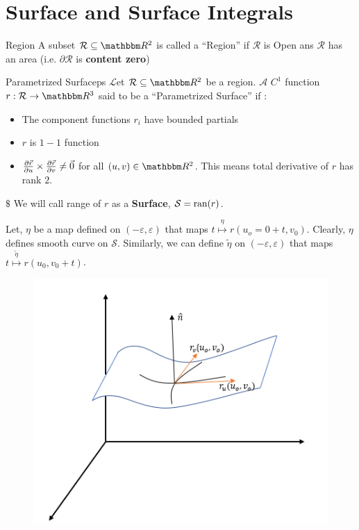 \documentclass[../Analysis-3]{subfiles}
\begin{document}
\section{Surface and Surface Integrals}

\begin{Def}{Region}{}
    A subset $\mathcal{R} \subseteq \R^2$ is called a \enquote{Region} if $\mathcal{R}$ is Open ans $\mathcal{R}$ has an area (i.e. $\partial \mathcal{R}$ is \textbf{content zero})
\end{Def}

\begin{Def}{Parametrized Surface}{ps}
    $\mathcal{L}$et $\mathcal{R} \subseteq \R^2$ be a region. $\mathcal{A}$ $C^1$ function $r:\mathcal{R} \to \R^3$ said to be a \enquote{Parametrized Surface} if :
    \begin{itemize}
        \item The component functions $r_i$ have bounded partials
        \item $r$ is $1-1$ function
        \item $\pdv{\vec{r}}{u} \times \pdv{\vec{r}}{v} \neq \vec{0}$ for all $(u,v) \in \R^2$. This means total derivative of $r$ has rank $2$.
    \end{itemize}
    $\$$ We will call range of $r$ as a \textbf{Surface}, $ \mathcal{S} = \operatorname{ran}(r)$.
\end{Def}

Let, $\eta$ be a map defined on $(-\varepsilon,\varepsilon)$ that maps $t \overset{\eta}{\mapsto} r(u_o=0 + t,v_0)$. Clearly, $\eta$ defines smooth curve on $\mathcal{S}$. Similarly, we can define $\tilde{\eta}$ on $(-\varepsilon,\varepsilon)$ that maps $t \overset{\tilde{\eta}}{\mapsto} r(u_0,v_0+t)$.

\begin{figure}
    \centering
    \includegraphics[width=.78\linewidth]{../figures/lec-24.2.png}
    \caption{\label{fig24:1}}
\end{figure}
\end{document}
